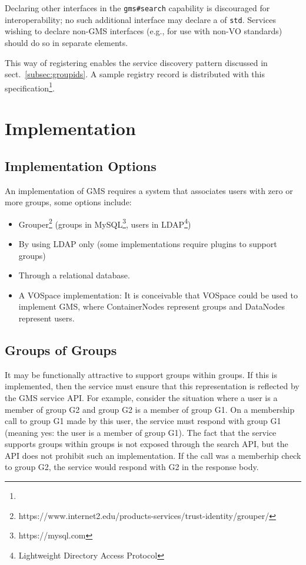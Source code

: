 \documentclass[11pt,a4paper]{ivoa}
\begin{document}
Declaring other interfaces in the \verb|gms#search| capability is discouraged for interoperability; no such additional interface may declare a  of \verb|std|.  Services wishing to declare non-GMS interfaces (e.g., for use with non-VO standards) should do so in separate  elements.

This way of registering enables the service discovery pattern discussed in sect.~\ref{subsec:groupids}.  A sample registry record is distributed with this specification\footnote{}.


\section {Implementation}

\subsection {Implementation Options}
\label{subsec:implopts}

An implementation of GMS requires a system that associates users with zero or more groups, some options include:

\begin{itemize}
\item Grouper\footnote{https://www.internet2.edu/products-services/trust-identity/grouper/} (groups in MySQL\footnote{https://mysql.com}, users in LDAP\footnote{Lightweight Directory Access Protocol})
\item By using LDAP only (some implementations require plugins to support groups)
\item Through a relational database.
\item A VOSpace implementation: It is conceivable that VOSpace could be used to implement GMS, where ContainerNodes represent groups and DataNodes represent users.
\end{itemize}

\subsection{Groups of Groups}
\label{subsec:groupsofgroups}

It may be functionally attractive to support groups within groups.  If this is implemented, then the service must ensure that this representation is reflected by the GMS service API.  For example, consider the situation where a user is a member of group G2 and group G2 is a member of group G1.  On a membership call to group G1 made by this user, the service must respond with group G1 (meaning yes: the user is a member of group G1).  The fact that the service supports groups within groups is not exposed through the search API, but the API does not prohibit such an implementation.  If the call was a memberhip check to group G2, the service would respond with G2 in the response body.
\end{document}
